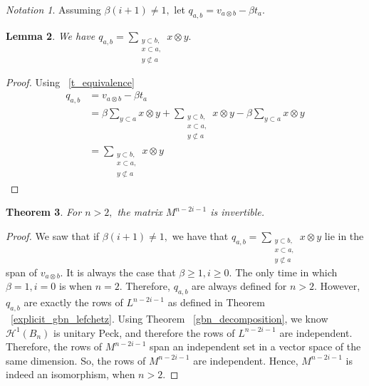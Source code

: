 \documentclass{amsart}
\newtheorem{thm}{Theorem}[subsection]
\newtheorem{lem}[thm]{Lemma}
\theoremstyle{remark}
\newtheorem{note}[thm]{Notation}
\newcommand\fbn{\mathcal H}
\begin{document}
\begin{note}
Assuming $\beta(i+1) \neq 1,$ let $q_{a,b} = v_{a\otimes b} - \beta t_a.$
\end{note}

\begin{lem}
We have $q_{a,b} = \sum_{\substack{{y\subset b,}\\{x \subset a,}\\{y\not\subset a}}}^{}x\otimes y.$
\end{lem}
\begin{proof}
Using ~\ref{t_equivalence}
\begin{align*}
	q_{a,b} &= v_{a\otimes b} - \beta t_a \\
	&= \beta \sum_{y \subset a}^{}x \otimes y + \sum_{\substack{{y\subset b,}\\{x \subset a,}\\{y\not\subset a}}}^{}x\otimes y - \beta\sum_{y\subset a}^{}x\otimes y\\
	&= \sum_{\substack{{y\subset b,}\\{x \subset a,}\\{y\not\subset a}}}^{}x\otimes y
\end{align*}
\end{proof}

\begin{thm}
For $n >2,$ the matrix $M^{n-2i-1}$ is invertible.
\end{thm}
\begin{proof}
We saw that if $\beta(i+1) \neq 1,$ we have that $q_{a,b} = \sum_{\substack{{y\subset b,}\\{x \subset a,}\\{y\not\subset a}}}^{}x\otimes y$ lie in the span of $v_{a\otimes b}.$ It is always the case that $\beta \geq 1,i \geq 0.$ The only time in which $\beta = 1,i=0$ is when $n = 2.$ Therefore, $q_{a,b}$ are always defined for $n > 2.$ However, $q_{a,b}$ are exactly the rows of $L^{n-2i-1}$ as defined in Theorem ~\ref{explicit_gbn_lefchetz}. Using Theorem ~\ref{gbn_decomposition}, we know $\fbn^1(B_n)$ is unitary Peck, and therefore the rows of $L^{n-2i-1}$ are independent. Therefore, the rows of $M^{n-2i-1}$ span an independent set in a vector space of the same dimension. So, the rows of $M^{n-2i-1}$ are independent. Hence, $M^{n-2i-1}$ is indeed an isomorphism, when $n > 2.$
\end{proof}
\end{document}
